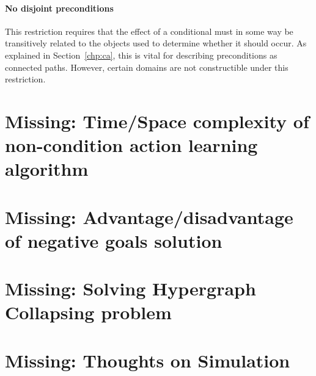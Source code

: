 \documentclass[Master.tex]{subfiles}
\begin{document}
\paragraph{No disjoint preconditions}
This restriction requires that the effect of a conditional must in some way be transitively related to the objects used to determine whether it should occur. As explained in Section~\ref{chp:ca}, this is vital for describing preconditions as connected paths. However, certain domains are not constructible under this restriction. 


\section{Missing: Time/Space complexity of non-condition action learning algorithm}

\section{Missing: Advantage/disadvantage of negative goals solution}

\section{Missing: Solving Hypergraph Collapsing problem}

\section{Missing: Thoughts on Simulation}

%    
%
%    
%
%    
\end{document}
